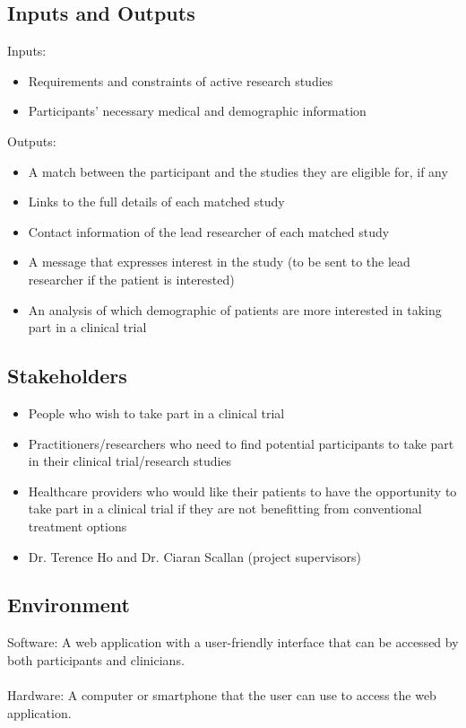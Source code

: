 \documentclass{article}
\begin{document}
\subsection{Inputs and Outputs}

Inputs:
\begin{itemize}
    \item Requirements and constraints of active research studies
    \item Participants' necessary medical and demographic information
\end{itemize}

\noindent Outputs:
\begin{itemize}
    \item A match between the participant and the studies they are eligible for, if any
    \item Links to the full details of each matched study
    \item Contact information of the lead researcher of each matched study
    \item A message that expresses interest in the study (to be sent to the lead researcher if the patient is interested)
    \item An analysis of which demographic of patients are more interested in taking part in a clinical trial
\end{itemize}

\subsection{Stakeholders}
\begin{itemize}
    \item People who wish to take part in a clinical trial
	\item Practitioners/researchers who need to find potential participants to take part in their clinical trial/research studies
	\item Healthcare providers who would like their patients to have the opportunity to take part in a clinical trial if they are not benefitting from conventional treatment options
    \item Dr. Terence Ho and Dr. Ciaran Scallan (project supervisors)
\end{itemize}

\subsection{Environment}
Software: A web application with a user-friendly interface that can be accessed by both participants and clinicians.\\
\\
Hardware: A computer or smartphone that the user can use to access the web application.
\end{document}
